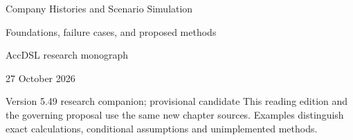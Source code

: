 \documentclass[11pt,a4paper]{report}
\begin{document}
\hypersetup{pageanchor=false}
\begin{titlepage}
{\Huge Company Histories and Scenario Simulation\par}
\vspace{12mm}
{\Large Foundations, failure cases, and proposed methods\par}
\vspace{8mm}
AccDSL research monograph\par 27 October 2026\par Version 5.49 research companion; provisional candidate
\vfill
This reading edition and the governing proposal use the same new chapter sources. Examples distinguish exact calculations, conditional assumptions and unimplemented methods.
\end{titlepage}
\hypersetup{pageanchor=true}
\tableofcontents
\clearpage{}


























\clearpage\label{sim:body-end}

\begingroup\raggedright
\endgroup
\end{document}
